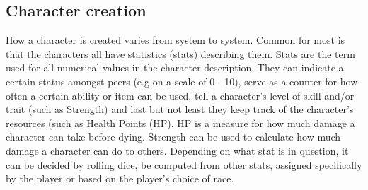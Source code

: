 \subsection{Character creation}

How a character is created varies from system to system. Common for most is that the characters all have statistics (stats) describing them.
Stats are the term used for all numerical values in the character description. They can indicate a certain status amongst peers (e.g on a scale of 0 - 10), serve as a counter for how often a certain ability or item can be used, tell a character's level of skill and/or trait (such as Strength) and last but not least they keep track of the character's resources (such as Health Points (HP).
HP is a measure for how much damage a character can take before dying. Strength can be used to calculate how much damage a character can do to others. Depending on what stat is in question, it can be decided by rolling dice, be computed from other stats, assigned specifically by the player or based on the player's choice of race.

